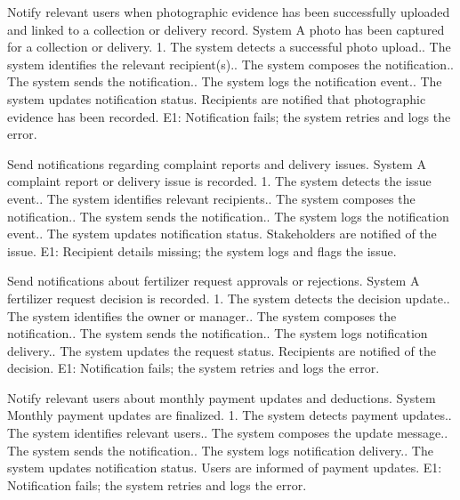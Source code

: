 {Notify relevant users when photographic evidence has been successfully uploaded and linked to a collection or delivery record.}
{System}
{A photo has been captured for a collection or delivery.}
{1. The system detects a successful photo upload.. The system identifies the relevant recipient(s).. The system composes the notification.. The system sends the notification.. The system logs the notification event.. The system updates notification status.}
{Recipients are notified that photographic evidence has been recorded.}
{E1: Notification fails; the system retries and logs the error.}

{Send notifications regarding complaint reports and delivery issues.}
{System}
{A complaint report or delivery issue is recorded.}
{1. The system detects the issue event.. The system identifies relevant recipients.. The system composes the notification.. The system sends the notification.. The system logs the notification event.. The system updates notification status.}
{Stakeholders are notified of the issue.}
{E1: Recipient details missing; the system logs and flags the issue.}

{Send notifications about fertilizer request approvals or rejections.}
{System}
{A fertilizer request decision is recorded.}
{1. The system detects the decision update.. The system identifies the owner or manager.. The system composes the notification.. The system sends the notification.. The system logs notification delivery.. The system updates the request status.}
{Recipients are notified of the decision.}
{E1: Notification fails; the system retries and logs the error.}

{Notify relevant users about monthly payment updates and deductions.}
{System}
{Monthly payment updates are finalized.}
{1. The system detects payment updates.. The system identifies relevant users.. The system composes the update message.. The system sends the notification.. The system logs notification delivery.. The system updates notification status.}
{Users are informed of payment updates.}
{E1: Notification fails; the system retries and logs the error.}

